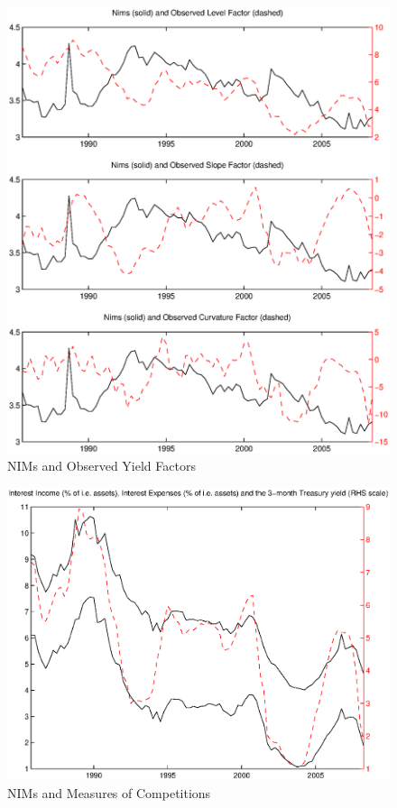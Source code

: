 \documentclass[12pt]{article}
\begin{document}
\begin{figure}[tbp]
\caption{NIMs and Observed Yield Factors} \label{figure_nims_factors}
\center
\includegraphics[scale=0.85]{figure_nims_factors.ps}
\end{figure}

\begin{figure}[tbp]
\caption{NIMs and Measures of Competitions} \label{figure_nims_competition}
\center
\includegraphics[scale=0.85]{figure_nims_competition.ps}
\end{figure}
\end{document}
